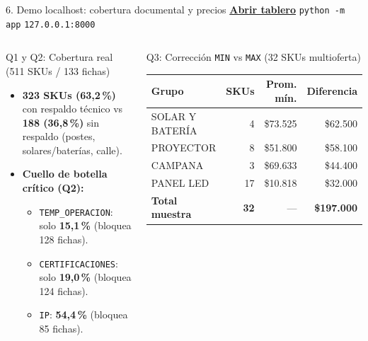 \documentclass[aspectratio=169,10pt]{beamer}
\begin{document}
\begin{frame}{6. Demo localhost: cobertura documental y precios}
\small \href{http://127.0.0.1:8000/}{\textbf{Abrir tablero}} \quad \texttt{python -m app} \quad
\texttt{127.0.0.1:8000}
\vspace{4pt}
\begin{columns}[T]
\begin{block}{Q1 y Q2: Cobertura real (511 SKUs / 133 fichas)}
\footnotesize
\begin{itemize}
    \item \textbf{323 SKUs (63,2\,\%)} con respaldo técnico vs \textbf{188 (36,8\,\%)} sin respaldo (postes, solares/baterías, calle).
    \item \textbf{Cuello de botella crítico (Q2):}
    \begin{itemize}\footnotesize
        \item \texttt{TEMP\_OPERACION}: solo \textbf{15,1\,\%} (bloquea 128 fichas).
        \item \texttt{CERTIFICACIONES}: solo \textbf{19,0\,\%} (bloquea 124 fichas).
        \item \texttt{IP}: \textbf{54,4\,\%} (bloquea 85 fichas).
    \end{itemize}
\end{itemize}
\end{block}
\begin{block}{Q3: Corrección \texttt{MIN} vs \texttt{MAX} (32 SKUs multioferta)}
\scriptsize
\begin{tabular}{lrrr}
\toprule
\textbf{Grupo} & \textbf{SKUs} & \textbf{Prom. mín.} & \textbf{Diferencia} \\
\midrule
SOLAR Y BATERÍA & 4 & \$73.525 & \$62.500 \\
PROYECTOR & 8 & \$51.800 & \$58.100 \\
CAMPANA & 3 & \$69.633 & \$44.400 \\
PANEL LED & 17 & \$10.818 & \$32.000 \\
\midrule
\textbf{Total muestra} & \textbf{32} & --- & \textbf{\$197.000} \\
\bottomrule
\end{tabular}
\vspace{4pt}
\end{block}
\end{columns}
\end{frame}
\end{document}
